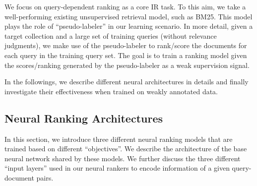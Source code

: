 We focus on query-dependent ranking as a core IR task. To this aim, we take a well-performing existing unsupervised retrieval model, such as BM25. This model plays the role of ``pseudo-labeler'' in our learning scenario. In more detail, given a target collection and a large set of training queries (without relevance judgments), we make use of the pseudo-labeler to rank/score the documents for each query in the training query set. The goal is to train a ranking model given the scores/ranking generated by the pseudo-labeler as a weak supervision signal.

In the followings, we describe different neural architectures in details and finally investigate their effectiveness when trained on weakly annotated data.  

\subsection{Neural Ranking Architectures}
\label{sec:neural_ranking_arch}
In this section, we introduce three different neural ranking models that are trained based on different ``objectives''. We describe the architecture of the base neural network shared by these models. We further discuss the three different ``input layers'' used in our neural rankers to encode information of a given query-document pairs.
\medskip

